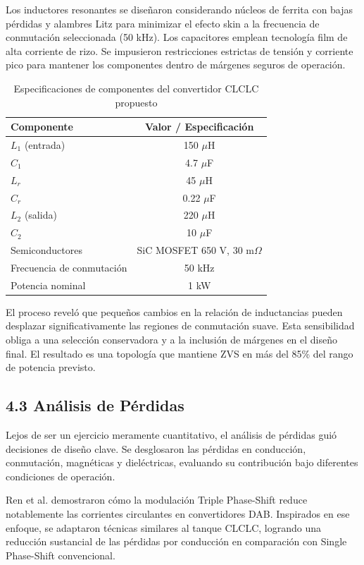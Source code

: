 Los inductores resonantes se diseñaron considerando núcleos de ferrita con bajas pérdidas y alambres Litz para minimizar el efecto skin a la frecuencia de conmutación seleccionada (50 kHz). Los capacitores emplean tecnología film de alta corriente de rizo. Se impusieron restricciones estrictas de tensión y corriente pico para mantener los componentes dentro de márgenes seguros de operación.

\begin{table}[h]
\centering
\caption{Especificaciones de componentes del convertidor CLCLC propuesto}
\label{tab:componentes}
\begin{tabular}{lc}
\hline
Componente & Valor / Especificación \\
\hline
$L_1$ (entrada) & 150 $\mu$H \\
$C_1$ & 4.7 $\mu$F \\
$L_r$ & 45 $\mu$H \\
$C_r$ & 0.22 $\mu$F \\
$L_2$ (salida) & 220 $\mu$H \\
$C_2$ & 10 $\mu$F \\
Semiconductores & SiC MOSFET 650 V, 30 m$\Omega$ \\
Frecuencia de conmutación & 50 kHz \\
Potencia nominal & 1 kW \\
\hline
\end{tabular}
\end{table}

El proceso reveló que pequeños cambios en la relación de inductancias pueden desplazar significativamente las regiones de conmutación suave. Esta sensibilidad obliga a una selección conservadora y a la inclusión de márgenes en el diseño final. El resultado es una topología que mantiene ZVS en más del 85\% del rango de potencia previsto.

\subsection{4.3 Análisis de Pérdidas}

Lejos de ser un ejercicio meramente cuantitativo, el análisis de pérdidas guió decisiones de diseño clave. Se desglosaron las pérdidas en conducción, conmutación, magnéticas y dieléctricas, evaluando su contribución bajo diferentes condiciones de operación.

Ren et al. \cite{Ren2022} demostraron cómo la modulación Triple Phase-Shift reduce notablemente las corrientes circulantes en convertidores DAB. Inspirados en ese enfoque, se adaptaron técnicas similares al tanque CLCLC, logrando una reducción sustancial de las pérdidas por conducción en comparación con Single Phase-Shift convencional.

